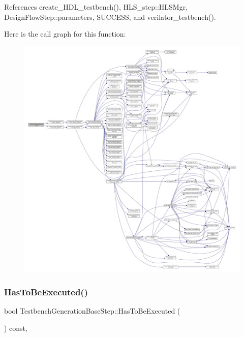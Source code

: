 References create\+\_\+\+H\+D\+L\+\_\+testbench(), H\+L\+S\+\_\+step\+::\+H\+L\+S\+Mgr, Design\+Flow\+Step\+::parameters, S\+U\+C\+C\+E\+SS, and verilator\+\_\+testbench().

Here is the call graph for this function\+:
\nopagebreak
\begin{figure}[H]
\begin{center}
\leavevmode
\includegraphics[width=350pt]{dc/d02/classTestbenchGenerationBaseStep_a81cdc7a419f3795b97b205cc8ac28e97_cgraph}
\end{center}
\end{figure}
\mbox{\label{classTestbenchGenerationBaseStep_a22c9fdb0a26c1947958a749ba2fa9a17}} 
\subsubsection{\texorpdfstring{Has\+To\+Be\+Executed()}{HasToBeExecuted()}}
{\footnotesize\ttfamily bool Testbench\+Generation\+Base\+Step\+::\+Has\+To\+Be\+Executed (\begin{DoxyParamCaption}{ }\end{DoxyParamCaption}) const\hspace{0.3cm}{\ttfamily [override]}, {\ttfamily [virtual]}}



